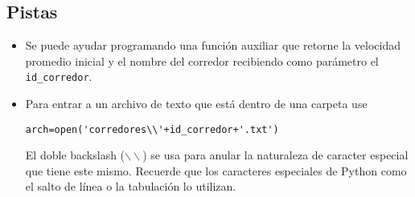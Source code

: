 \subsection{Pistas}
\begin{itemize}
    \item Se puede ayudar programando una función auxiliar que retorne la velocidad promedio inicial y el nombre del corredor recibiendo como parámetro el \texttt{id\_corredor}.
    \item Para entrar a un archivo de texto que está dentro de una carpeta use
    \begin{lstlisting}[style=consola]
arch=open('corredores\\'+id_corredor+'.txt')
    \end{lstlisting}
    El doble backslash ($\backslash \backslash$) se usa para anular la naturaleza de caracter especial que tiene este mismo. Recuerde que los caracteres especiales de Python como el salto de línea o la tabulación lo utilizan.
\end{itemize}